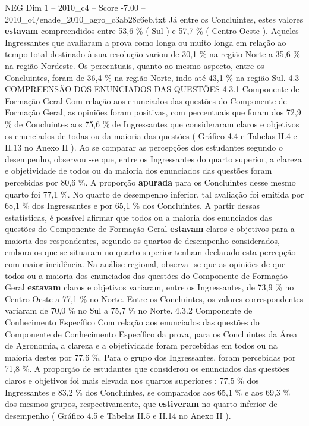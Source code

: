 \begin{textsample}{NEG Dim 1 – 2010\_c4 – Score -7.00 – 2010\_c4/enade\_2010\_agro\_c3ab28c6eb.txt}
Já entre os Concluintes, estes valores \textbf{estavam} compreendidos entre 53,6 \% ( Sul ) e 57,7 \% ( Centro-Oeste ).
Aqueles Ingressantes que avaliaram a prova como longa ou muito longa em relação ao tempo total destinado à sua resolução variou de 30,1 \% na região Norte a 35,6 \% na região Nordeste.
Os percentuais, quanto ao mesmo aspecto, entre os Concluintes, foram de 36,4 \% na região Norte, indo até 43,1 \% na região Sul. 4.3 COMPREENSÃO DOS ENUNCIADOS DAS QUESTÕES 4.3.1 Componente de Formação Geral Com relação aos enunciados das questões do Componente de Formação Geral, as opiniões foram positivas, com percentuais que foram dos 72,9 \% de Concluintes aos 75,6 \% de Ingressantes que consideraram claros e objetivos os enunciados de todas ou da maioria das questões ( Gráfico 4.4 e Tabelas II.4 e II.13 no Anexo II ).
Ao se comparar as percepções dos estudantes segundo o desempenho, observou -se que, entre os Ingressantes do quarto superior, a clareza e objetividade de todos ou da maioria dos enunciados das questões foram percebidas por 80,6 \%.
A proporção \textbf{apurada} para os Concluintes desse mesmo quarto foi 77,1 \%.
No quarto de desempenho inferior, tal avaliação foi emitida por 68,1 \% dos Ingressantes e por 65,1 \% dos Concluintes.
A partir dessas estatísticas, é possível afirmar que todos ou a maioria dos enunciados das questões do Componente de Formação Geral \textbf{estavam} claros e objetivos para a maioria dos respondentes, segundo os quartos de desempenho considerados, embora os que se situaram no quarto superior tenham declarado esta percepção com maior incidência.
Na análise regional, observa -se que as opiniões de que todos ou a maioria dos enunciados das questões do Componente de Formação Geral \textbf{estavam} claros e objetivos variaram, entre os Ingressantes, de 73,9 \% no Centro-Oeste a 77,1 \% no Norte.
Entre os Concluintes, os valores correspondentes variaram de 70,0 \% no Sul a 75,7 \% no Norte. 4.3.2 Componente de Conhecimento Específico Com relação aos enunciados das questões do Componente de Conhecimento Específico da prova, para os Concluintes da Área de Agronomia, a clareza e a objetividade foram percebidas em todos ou na maioria destes por 77,6 \%.
Para o grupo dos Ingressantes, foram percebidas por 71,8 \%.
A proporção de estudantes que considerou os enunciados das questões claros e objetivos foi mais elevada nos quartos superiores : 77,5 \% dos Ingressantes e 83,2 \% dos Concluintes, se comparados aos 65,1 \% e aos 69,3 \% dos mesmos grupos, respectivamente, que \textbf{estiveram} no quarto inferior de desempenho ( Gráfico 4.5 e Tabelas II.5 e II.14 no Anexo II ).

\end{textsample}
